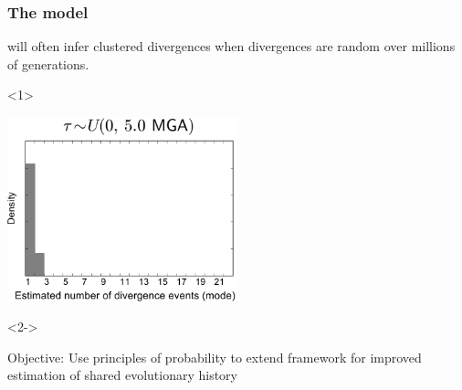 \begin{frame}[t]
    \frametitle{The \msb model}
    \begin{minipage}[c][0.18\textheight][c]{\linewidth}
        \msb will often infer clustered divergences when divergences are random
        over millions of generations.
    \end{minipage}


    \begin{onlyenv}<1>
        \vspace{-3mm}
        \begin{center}
            \includegraphics[width=0.5\textwidth]{../images/old_old_power_psi_mode_last.pdf}
        \end{center}
    \end{onlyenv}
    \begin{onlyenv}<2->
        \begin{block}{Objective:}
            Use principles of probability to extend \msb framework for improved
            estimation of shared evolutionary history
        \end{block}
    \end{onlyenv}
\end{frame}

